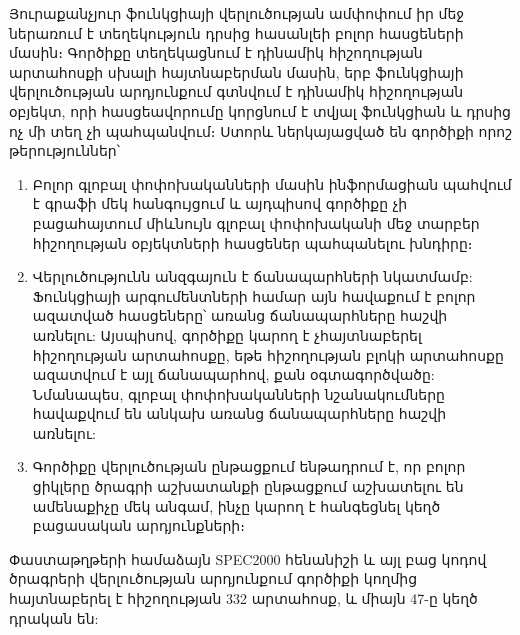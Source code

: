 Յուրաքանչյուր ֆունկցիայի վերլուծության ամփոփում իր մեջ ներառում է տեղեկություն դրսից հասանլեի բոլոր հասցեների մասին։
Գործիքը տեղեկացնում է դինամիկ հիշողության արտահոսքի սխալի հայտնաբերման մասին, երբ ֆունկցիայի վերլուծության արդյունքում
գտնվում է դինամիկ հիշողության օբյեկտ, որի հասցեավորումը կորցնում է տվյալ ֆունկցիան և դրսից ոչ մի տեղ չի պահպանվում։
Ստորև ներկայացված են գործիքի որոշ թերություններ՝
\begin{enumerate}
    \item Բոլոր գլոբալ փոփոխականների մասին ինֆորմացիան պահվում է գրաֆի մեկ հանգույցում և այդպիսով գործիքը չի բացահայտում
    միևնույն գլոբալ փոփոխականի մեջ տարբեր հիշողության օբյեկտների հասցեներ պահպանելու խնդիրը։
    \item Վերլուծությունն անզգայուն է ճանապարհների նկատմամբ: Ֆունկցիայի արգումենտների համար այն հավաքում է բոլոր ազատված
    հասցեները՝ առանց ճանապարհները հաշվի առնելու: Այսպիսով, գործիքը կարող է չհայտնաբերել հիշողության արտահոսքը,
    եթե հիշողության բլոկի արտահոսքը ազատվում է այլ ճանապարհով, քան օգտագործվածը: Նմանապես, գլոբալ փոփոխականների
    նշանակումները հավաքվում են անկախ առանց ճանապարհները հաշվի առնելու:
    \item Գործիքը վերլուծության ընթացքում ենթադրում է, որ բոլոր ցիկլերը ծրագրի աշխատանքի ընթացքում աշխատելու են ամենաքիչը
    մեկ անգամ, ինչը կարող է հանգեցնել կեղծ բացասական արդյունքների։
\end{enumerate}

Փաստաթղթերի համաձայն SPEC2000 հենանիշի և այլ բաց կոդով ծրագրերի վերլուծության արդյունքում գործիքի կողմից հայտնաբերել է
հիշողության 332 արտահոսք, և միայն 47-ը կեղծ դրական են:

